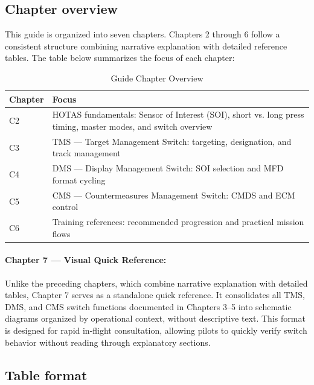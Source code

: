 \documentclass[11pt, a4paper, twoside]{report}
\begin{document}
\subsection{Chapter overview}
\label{sec:C1-S3-S1}

This guide is organized into seven chapters. Chapters 2 through 6 follow a consistent structure combining narrative explanation with detailed reference tables. The table below summarizes the focus of each chapter:

\begin{table}[H]
\centering
\caption{Guide Chapter Overview}
\label{tab:C1-chapter-overview}
\small
\renewcommand{\arraystretch}{1.25}
\begin{tabular}{C{1.5cm} L{12.0cm}}
\toprule
\textbf{Chapter} & \textbf{Focus} \\
\midrule
C2 & HOTAS fundamentals: Sensor of Interest (SOI), short vs. long press timing, master modes, and switch overview \\
C3 & TMS --- Target Management Switch: targeting, designation, and track management \\
C4 & DMS --- Display Management Switch: SOI selection and MFD format cycling \\
C5 & CMS --- Countermeasures Management Switch: CMDS and ECM control \\
C6 & Training references: recommended progression and practical mission flows \\
\bottomrule
\end{tabular}
\end{table}

\paragraph{Chapter 7 --- Visual Quick Reference:}
Unlike the preceding chapters, which combine narrative explanation with detailed tables, Chapter 7 serves as a standalone quick reference. It consolidates all TMS, DMS, and CMS switch functions documented in Chapters 3--5 into schematic diagrams organized by operational context, without descriptive text. This format is designed for rapid in-flight consultation, allowing pilots to quickly verify switch behavior without reading through explanatory sections.

\subsection{Table format}
\label{sec:C1-S3-S2}
\end{document}
